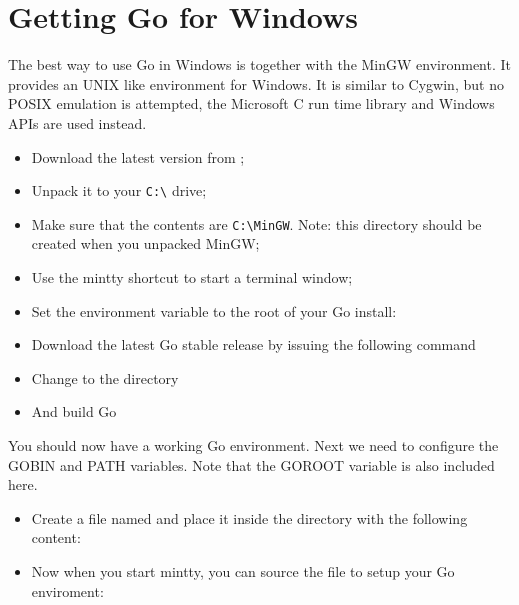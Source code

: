 \section{Getting Go for Windows}
The best way to use Go in Windows is together with the MinGW \cite{go_windows}  environment. 
It provides an UNIX like environment for Windows. It is similar to Cygwin, but no POSIX
emulation is attempted, the Microsoft C run time library and Windows APIs are used instead.
\begin{itemize}
\item Download the latest version from \cite{go_windows};
\item Unpack it to your \verb|C:\| drive;
\item Make sure that the contents are \verb|C:\MinGW|. Note: this directory should be
created when you unpacked MinGW;
\item Use the mintty shortcut to start a terminal window;
\item Set the environment variable  to the root of your
Go install:
\begin{display}
\pr {}
\end{display}
\item Download the latest Go stable release by issuing the following command
\begin{display}
\pr {}
\end{display}
\item Change to the  directory
\begin{display}
\pr {}
\end{display}
\item And build Go
\begin{display}
\pr {}
\end{display}
\end{itemize}
You should now have a working Go environment. Next we need to configure
the GOBIN and PATH variables. Note that the GOROOT variable is also included here.

\begin{itemize}
\item Create a file named  and place it inside the  directory
with the following content:
\item Now when you start mintty, you can source the file to setup your Go enviroment:
\begin{display}
\pr {}
\end{display}
\end{itemize}

